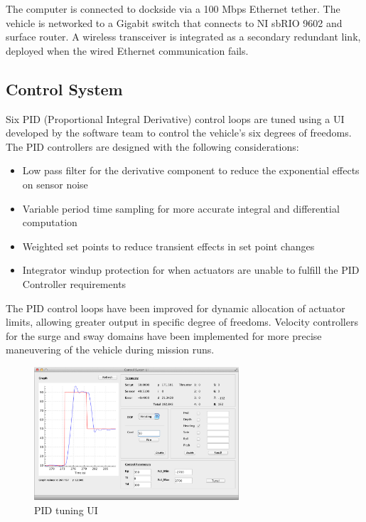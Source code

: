 \documentclass[journal,12pt]{IEEEtran}
\begin{document}
The computer is connected to dockside via a 100 Mbps Ethernet tether. The vehicle is networked to a Gigabit switch that connects to NI sbRIO 9602 and surface router. A wireless transceiver is integrated as a secondary redundant link, deployed when the wired Ethernet communication fails. 

\subsection{Control System}
Six PID (Proportional Integral Derivative) control loops are tuned using a UI developed by the software team to control the vehicle's six degrees of freedoms. The PID controllers are designed with the following considerations:

\begin{itemize}
\item {Low pass filter for the derivative component to reduce the exponential effects on sensor noise}
\item {Variable period time sampling for more accurate integral and differential computation}
\item {Weighted set points to reduce transient effects in set point changes}
\item {Integrator windup protection for when actuators are unable to fulfill the PID Controller requirements \\ }
\end{itemize}

The PID control loops have been improved for dynamic allocation of actuator limits, allowing greater output in specific degree of freedoms. Velocity controllers for the surge and sway domains have been implemented for more precise maneuvering of the vehicle during mission runs.

\begin{figure}[h]
\centering
\includegraphics[width=3in]{controlui.png}
\caption{PID tuning UI}
\captionsetup{justification=centering}
\end{figure}
\end{document}
